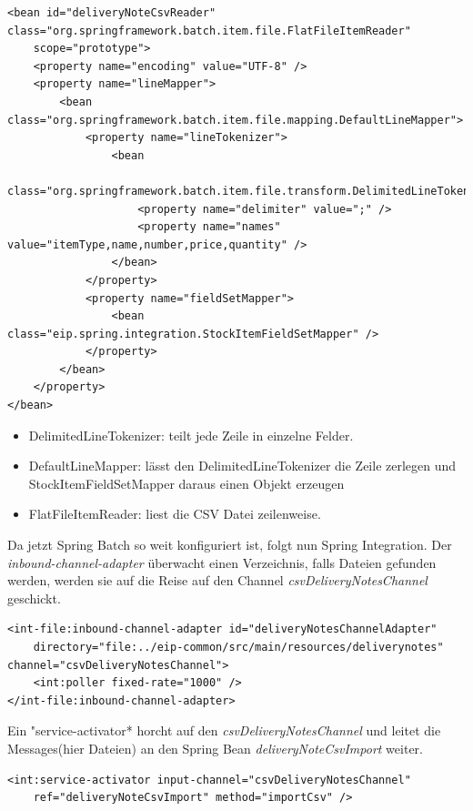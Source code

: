 \documentclass[12pt,a4paper,ngerman]{article}
\begin{document}
\begin{lstlisting}
<bean id="deliveryNoteCsvReader" class="org.springframework.batch.item.file.FlatFileItemReader"
    scope="prototype">
    <property name="encoding" value="UTF-8" />
    <property name="lineMapper">
        <bean class="org.springframework.batch.item.file.mapping.DefaultLineMapper">
            <property name="lineTokenizer">
                <bean
                    class="org.springframework.batch.item.file.transform.DelimitedLineTokenizer">
                    <property name="delimiter" value=";" />
                    <property name="names" value="itemType,name,number,price,quantity" />
                </bean>
            </property>
            <property name="fieldSetMapper">
                <bean class="eip.spring.integration.StockItemFieldSetMapper" />
            </property>
        </bean>
    </property>
</bean>
\end{lstlisting}

\begin{itemize}
\item
  DelimitedLineTokenizer: teilt jede Zeile in einzelne Felder.
\item
  DefaultLineMapper: lässt den DelimitedLineTokenizer die Zeile zerlegen
  und StockItemFieldSetMapper daraus einen Objekt erzeugen
\item
  FlatFileItemReader: liest die CSV Datei zeilenweise.
\end{itemize}

Da jetzt Spring Batch so weit konfiguriert ist, folgt nun Spring
Integration. Der \emph{inbound-channel-adapter} überwacht einen
Verzeichnis, falls Dateien gefunden werden, werden sie auf die Reise auf
den Channel \emph{csvDeliveryNotesChannel} geschickt.

\begin{lstlisting}
<int-file:inbound-channel-adapter id="deliveryNotesChannelAdapter"
    directory="file:../eip-common/src/main/resources/deliverynotes" channel="csvDeliveryNotesChannel">
    <int:poller fixed-rate="1000" />
</int-file:inbound-channel-adapter>
\end{lstlisting}

Ein "service-activator* horcht auf den \emph{csvDeliveryNotesChannel}
und leitet die Messages(hier Dateien) an den Spring Bean
\emph{deliveryNoteCsvImport} weiter.

\begin{lstlisting}
<int:service-activator input-channel="csvDeliveryNotesChannel"
    ref="deliveryNoteCsvImport" method="importCsv" />
\end{lstlisting}
\end{document}
